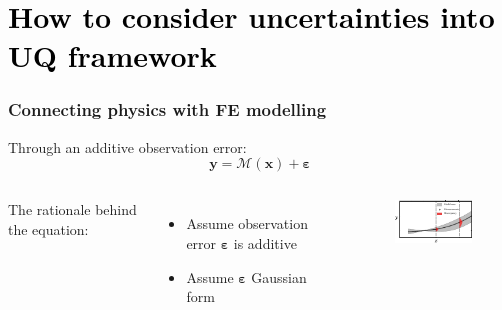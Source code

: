 
\section{\textcolor{black}{How to consider uncertainties into UQ framework}}
\begin{frame}\frametitle{Connecting physics with FE modelling}
\begin{block}{Through an additive observation error:}
  \begin{equation}
 \label{eq: modelling_discrepancy}
 \boldsymbol{y} = \mathcal{M}(\boldsymbol{x}) + \boldsymbol{\varepsilon}
\end{equation}  
\end{block}
\begin{columns}
The rationale behind the equation:
\begin{itemize}
    \item Assume observation error $\boldsymbol{\varepsilon}$ is additive
    \item Assume $\boldsymbol{\varepsilon}$ Gaussian form
\end{itemize}
\begin{figure}[!ht]       
\includegraphics[scale=3]{figures/figure-likelihood.pdf}
\end{figure}
\end{columns}
 
\end{frame}
